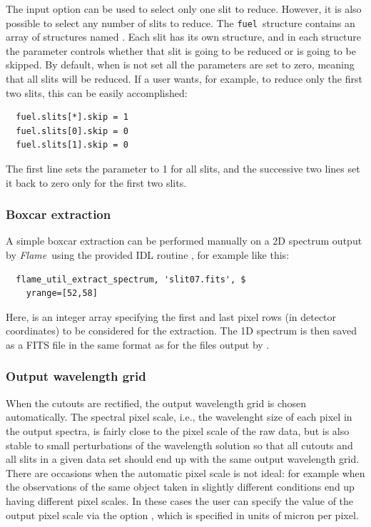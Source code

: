 \documentclass[a4paper]{article}
\newcommand{\flame}{\emph{Flame}}
\newcommand{\fuel}{\texttt{fuel}}
\begin{document}
\begin{sloppypar}
The input option  can be used to select only one slit to reduce. However, it is also possible to select any number of slits to reduce. The \fuel\ structure contains an array of structures named . Each slit has its own structure, and in each structure the parameter  controls whether that slit is going to be reduced or is going to be skipped. By default, when   is not set all the  parameters are set to zero, meaning that all slits will be reduced. If a user wants, for example, to reduce only the first two slits, this can be easily accomplished:
\begin{lstlisting}
  fuel.slits[*].skip = 1
  fuel.slits[0].skip = 0
  fuel.slits[1].skip = 0
\end{lstlisting}
The first line sets the  parameter to 1 for all slits, and the successive two lines set it back to zero only for the first two slits.


\subsubsection{Boxcar extraction}

A simple boxcar extraction can be performed manually on a 2D spectrum output by \flame\ using the provided IDL routine , for example like this:
\begin{lstlisting}
  flame_util_extract_spectrum, 'slit07.fits', $
    yrange=[52,58]
\end{lstlisting}
Here,  is an integer array specifying the first and last pixel rows (in detector coordinates) to be considered for the extraction. The 1D spectrum is then saved as a FITS file in the same format as for the files output by .


\subsubsection{Output wavelength grid}

When the cutouts are rectified, the output wavelength grid is chosen automatically. The spectral pixel scale, i.e., the wavelenght size of each pixel in the output spectra, is fairly close to the pixel scale of the raw data, but is also stable to small perturbations of the wavelength solution so that all cutouts and all slits in a given data set should end up with the same output wavelength grid. There are occasions when the automatic pixel scale is not ideal: for example when the observations of the same object taken in slightly different conditions end up having different pixel scales. In these cases the user can specify the value of the output pixel scale via the option , which is specified in units of micron per pixel.



\end{sloppypar}
\end{document}
